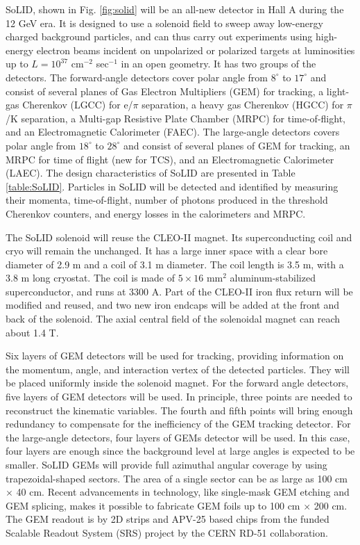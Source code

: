 SoLID, shown in Fig. \ref{fig:solid} will be an all-new detector in Hall A
during the 12 GeV era. It is designed to use a solenoid field to sweep away
low-energy charged background particles, and can thus carry out experiments
using high-energy electron beams incident on unpolarized or polarized targets
at luminosities up to $L=10^{37}$ cm$^{-2}$ sec$^{-1}$ in an open geometry.
It has two groups of the detectors. The forward-angle detectors cover polar
angle from $8^\circ$ to $17^\circ$ and consist of several planes of Gas
Electron Multipliers (GEM) for tracking, a light-gas Cherenkov (LGCC) for
e/$\pi$ separation, a heavy gas Cherenkov (HGCC) for $\pi$/K separation,
a Multi-gap Resistive Plate Chamber (MRPC) for time-of-flight, and an
Electromagnetic Calorimeter (FAEC).
The large-angle detectors covers polar angle from $18^\circ$ to $28^\circ$
and consist of several planes of GEM for tracking, an MRPC for time of flight
(new for TCS), and an Electromagnetic Calorimeter (LAEC). The design
characteristics of SoLID are presented in Table \ref{table:SoLID}. Particles
in SoLID will be detected and identified by measuring their momenta,
time-of-flight, number of photons produced in the threshold Cherenkov
counters, and energy losses in the calorimeters and MRPC.

The SoLID solenoid will reuse the CLEO-II magnet. Its superconducting coil and
cryo will remain the unchanged. It has a large inner space with a clear bore
diameter of 2.9 m and a coil of 3.1 m diameter. The coil length is 3.5 m, with
a 3.8 m long cryostat. The coil is made of  $5 \times 16$ mm$^2$
aluminum-stabilized superconductor, and runs at 3300 A.
Part of the CLEO-II iron flux return will be modified and reused, and two new
iron endcaps will be added at the front and back of the solenoid. The axial
central field of the solenoidal magnet can reach about 1.4 T.

Six layers of GEM detectors will be used for tracking, providing information
on the momentum, angle, and interaction vertex of the detected particles. They
will be placed uniformly inside the solenoid magnet. For the forward angle
detectors, five layers
of GEM detectors will be used. In principle, three points are needed to
reconstruct the kinematic variables. The fourth and fifth points will bring
enough redundancy to compensate for the inefficiency of the GEM tracking
detector. For the large-angle detectors, four layers of GEMs detector will be
used. In this case, four layers are enough since the background level at
large angles is expected to be smaller. SoLID GEMs will provide full azimuthal
angular coverage by using trapezoidal-shaped sectors. The area of a single
sector can be as large as 100 cm $\times$ 40 cm. Recent advancements in
technology, like single-mask GEM etching and GEM splicing, makes it possible
to fabricate GEM foils up to 100 cm $\times$ 200 cm. The GEM readout is by
2D strips and APV-25 based chips from the funded Scalable Readout System (SRS)
project by the CERN RD-51 collaboration.

